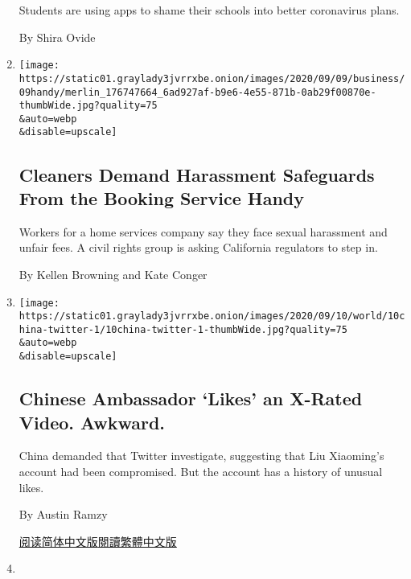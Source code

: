 \begin{enumerate}
  Students are using apps to shame their schools into better coronavirus
  plans.

  By Shira Ovide
\item
  \href{/2020/09/10/business/handy-service-cleaners-harassment.html}{}

  \texttt{[image: https://static01.graylady3jvrrxbe.onion/images/2020/09/09/business/09handy/merlin\_176747664\_6ad927af-b9e6-4e55-871b-0ab29f00870e-thumbWide.jpg?quality=75\\\&auto=webp\\\&disable=upscale]}

  \hypertarget{cleaners-demand-harassment-safeguards-from-the-booking-service-handy}{%
  \subsection{Cleaners Demand Harassment Safeguards From the Booking
  Service
  Handy}\label{cleaners-demand-harassment-safeguards-from-the-booking-service-handy}}

  Workers for a home services company say they face sexual harassment
  and unfair fees. A civil rights group is asking California regulators
  to step in.

  By Kellen Browning and Kate Conger
\item
  \href{/2020/09/10/world/asia/liu-xiaoming-twitter-video.html}{}

  \texttt{[image: https://static01.graylady3jvrrxbe.onion/images/2020/09/10/world/10china-twitter-1/10china-twitter-1-thumbWide.jpg?quality=75\\\&auto=webp\\\&disable=upscale]}

  \hypertarget{chinese-ambassador-likes-an-x-rated-video-awkward}{%
  \subsection{Chinese Ambassador `Likes' an X-Rated Video.
  Awkward.}\label{chinese-ambassador-likes-an-x-rated-video-awkward}}

  China demanded that Twitter investigate, suggesting that Liu
  Xiaoming's account had been compromised. But the account has a history
  of unusual likes.

  By Austin Ramzy

  \href{https://cn.nytimes3xbfgragh.onion/china/20200911/china-ambassador-twitter/}{阅读简体中文版}\href{https://cn.nytimes3xbfgragh.onion/china/20200911/china-ambassador-twitter/zh-hant/}{閱讀繁體中文版}
\item
  \href{/interactive/2020/09/09/us/powerful-people-race-us.html}{}


\end{enumerate}
